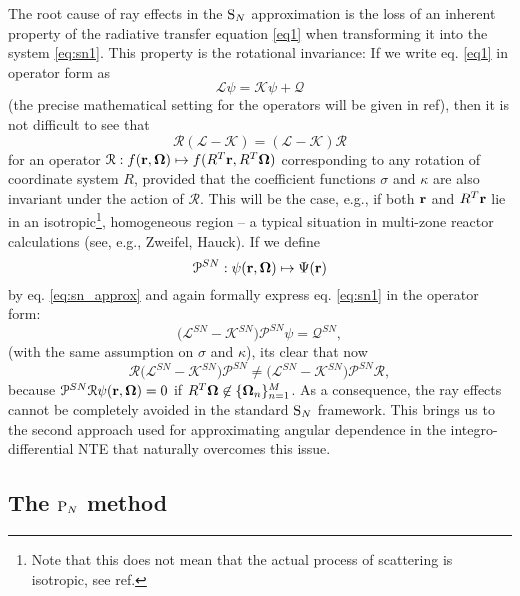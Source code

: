 The root cause of ray effects in the $\text{S}_{N}$ approximation is the loss of an inherent property of the radiative transfer
equation \eqref{eq1} when transforming it into the system \eqref{eq:sn1}. This property is the rotational invariance: If
we write eq. \eqref{eq1} in operator form as 
\begin{equation}\label{eq1op}
	\mathcal{L}\psi = \mathcal{K}\psi + \mathcal{Q}
\end{equation} 
(the precise mathematical setting for the operators will be given in \alert{ref}), then it is not
difficult to see that 
$$
	\mathcal{R}(\mathcal{L} - \mathcal{K}) = (\mathcal{L} - \mathcal{K})\mathcal{R}
$$ 
for an operator $\mathcal{R}: f(\mathbf{r},\mathbf{\Omega}) \mapsto f(R^T\mathbf{r},R^T\mathbf{\Omega})$ corresponding to any rotation of
coordinate system $R$, provided that the coefficient functions $\sigma$ and $\kappa$ are also invariant under the action
of $\mathcal{R}$. This will be the case, e.g., if both $\mathbf{r}$ and $R^T\mathbf{r}$ lie in an isotropic\footnote{Note that this
does not mean that the actual process of scattering is isotropic, see \alert{ref}.}, homogeneous region -- a typical
situation in multi-zone reactor calculations (see, e.g., \alert{Zweifel, Hauck}). If we define 
$$
	\mathcal{P}^{SN}: \psi(\mathbf{r},\mathbf{\Omega}) \mapsto \Psi(\mathbf{r}) 
$$
by eq. \eqref{eq:sn_approx} and again formally express eq. \eqref{eq:sn1} in the operator form:
$$
	\bigl(\mathcal{L}^{SN} - \mathcal{K}^{SN}\bigr)\mathcal{P}^{SN}\psi = \mathcal{Q}^{SN},
$$
(with the same assumption on $\sigma$ and $\kappa$), its clear that now
$$
	\mathcal{R}\bigl(\mathcal{L}^{SN} - \mathcal{K}^{SN}\bigr)\mathcal{P}^{SN} \neq \bigl(\mathcal{L}^{SN} -
	\mathcal{K}^{SN}\bigr)\mathcal{P}^{SN}\mathcal{R},
$$	
because $\mathcal{P}^{SN}\mathcal{R}\psi(\mathbf{r},\mathbf{\Omega}) = 0$ if $R^T\mathbf{\Omega} \not\in \{\mathbf{\Omega}_n\}_{n=1}^{M}$. As a
consequence, the ray effects cannot be completely avoided in the standard $\text{S}_{N}$ framework. This brings us to the second
 approach used for approximating angular dependence in the integro-differential NTE that naturally overcomes
this issue.

\subsection{The $\text{P}_{N}$ method}

